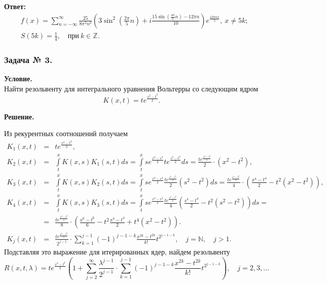 \noindent
\textbf{Ответ:}
\[
\begin{split}
&f(x)=\sum_{n=-\infty}^\infty\frac{25}{8\pi^{2} n^{2}} \left( 3\sin^{2} \left(\frac{2\pi}{5} n  \right) + i \frac{ 15\sin \left(\frac{4\pi}{5} n  \right) - 12\pi n}{10}  \right) e^{\tfrac{i2\pi nx}{5}},~ x\ne 5k; \\
&S(5k)=\frac{1}{4},\quad\text{при}~k\in\mathbb{Z}.
\end{split}
\]


\subsubsection*{\center Задача № 3.}
{\bf Условие.~}\\
Найти резольвенту для интегрального уравнения Вольтерры со следующим ядром
$$K(x,t)=te^\frac{x^2-t^2}{2}.$$

\noindent
{\bf Решение.~}\\
\noindent

Из рекурентных соотношений получаем
$$
\begin{array}{rcl}
K_1(x,t)&=&\displaystyle te^\frac{x^2-t^2}{2}, \\[12pt]
K_2(x,t)&=&\displaystyle\int\limits_t^x K(x,s)K_1(s,t)ds = \int\limits_t^x se^\frac{x^2-s^2}{2} te^\frac{s^2-t^2}{2} ds = \frac {te^\frac{x^2-t^2}{2}}{2}\cdot(x^{2}-t^{2}),\\[12pt]
K_3(x,t)&=&\displaystyle\int\limits_t^x K(x,s)K_2(s,t)ds = \int\limits_t^x se^\frac{x^2-s^2}{2} \frac{te^\frac{s^2-t^2}{2}}{2} (s^2-t^2) ds = \frac {te^\frac{x^2-t^2}{2}}{4}\cdot\left(\frac {x^{4}-t^{4}}{2} - t^2(x^{2}-t^{2})\right),\\[12pt]
K_4(x,t)&=&\displaystyle\int\limits_t^x K(x,s)K_3(s,t)ds = \int\limits_t^x se^\frac{x^2-s^2}{2} \frac{te^\frac{s^2-t^2}{2}}{4} \left(\frac{s^4-t^4}{2} - t^2(s^2-t^2)\right) ds = \\[12pt]
&=&\displaystyle \frac {te^\frac{x^2-t^2}{2}}{8}\cdot\left(\frac{x^6-t^6}{6}-t^2\frac {x^{4}-t^{4}}{2} + t^4(x^{2}-t^{2})\right).\\[12pt]
K_j(x,t)&=&\displaystyle\frac {te^\frac{x^2-t^2}{2}}{2^{j-1}}\cdot \sum_{k=1}^{j-1} (-1)^{j-1-k}\frac{x^{2k}-t^{2k}}{k!} t^{2^{j-1-k}}      ,\quad j=\mathbb{N},\quad j>1.
\end{array}
$$
Подставляя это выражение для итерированных ядер, найдем резольвенту
$$
R(x,t,\lambda)=te^\frac{x^2-t^2}{2}\left(1+\sum_{j=2}^\infty \frac {\lambda^{j-1}}{2^{j-1}}\cdot \sum_{k=1}^{j-1} (-1)^{j-1-k}\frac{x^{2k}-t^{2k}}{k!} t^{2^{j-1-k}}\right),
\quad j=2,3,\ldots
$$

